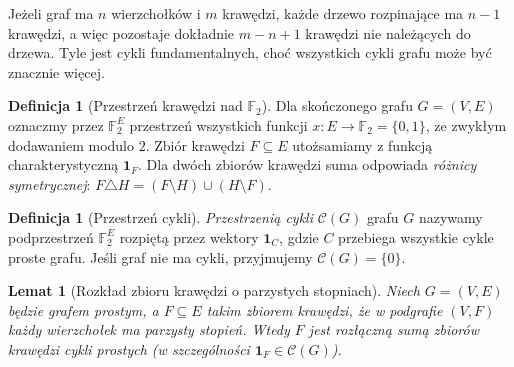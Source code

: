 \documentclass[11pt,a4paper]{report}
\numberwithin{equation}{section}
\theoremstyle{plain}
\newtheorem{lemat}[twierdzenie]{Lemat}
\theoremstyle{definition}
\newtheorem{definicja}[twierdzenie]{Definicja}
\theoremstyle{remark}
\begin{document}
Jeżeli graf ma $n$ wierzchołków i $m$ krawędzi,
każde drzewo rozpinające ma $n-1$ krawędzi,
a więc pozostaje dokładnie $m-n+1$ krawędzi
nie należących do drzewa. Tyle jest cykli
fundamentalnych, choć wszystkich cykli grafu
może być znacznie więcej.

\begin{center}
\end{center}

\begin{definicja}[Przestrzeń krawędzi nad $\mathbb F_2$]
Dla skończonego grafu $G=(V,E)$ oznaczmy
przez $\mathbb F_2^E$ przestrzeń wszystkich
funkcji $x:E\to\mathbb F_2=\{0,1\}$, ze
zwykłym dodawaniem modulo $2$.
Zbiór krawędzi $F\subseteq E$ utożsamiamy
z funkcją charakterystyczną $\mathbf1_F$.
Dla dwóch zbiorów krawędzi suma odpowiada
\emph{różnicy symetrycznej}:
$F\triangle H=(F\setminus H)\cup(H\setminus F)$.
\end{definicja}

\begin{definicja}[Przestrzeń cykli]
\emph{Przestrzenią cykli} $\mathcal C(G)$ grafu
$G$ nazywamy podprzestrzeń $\mathbb F_2^E$
rozpiętą przez wektory $\mathbf1_C$,
gdzie $C$ przebiega wszystkie cykle proste grafu.
Jeśli graf nie ma cykli, przyjmujemy
$\mathcal C(G)=\{0\}$.
\end{definicja}

\begin{lemat}[Rozkład zbioru krawędzi o parzystych stopniach]
Niech $G=(V,E)$ będzie grafem prostym,
a $F\subseteq E$ takim zbiorem krawędzi,
że w podgrafie $(V,F)$ każdy wierzchołek ma
parzysty stopień. Wtedy $F$ jest rozłączną
sumą zbiorów krawędzi cykli prostych
(w szczególności $\mathbf1_F\in\mathcal C(G)$).
\end{lemat}
\end{document}
